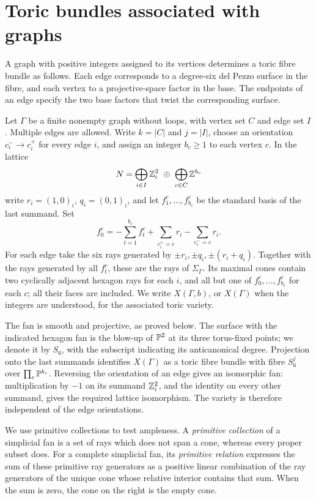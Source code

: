 \section{Toric bundles associated with graphs}\label{sec:graphs}

A graph with positive integers assigned to its vertices determines a
toric fibre bundle as follows. Each edge corresponds to a degree-six
del Pezzo surface in the fibre, and each vertex to a projective-space
factor in the base. The endpoints of an edge specify the two base
factors that twist the corresponding surface.

\begin{definition}\label{graph:construction}
Let $\Gamma$ be a finite nonempty graph without loops, with vertex set $C$
and edge set $I$.  Multiple edges are allowed.  Write $k=|C|$ and $j=|I|$,
choose an orientation $c_i^-\to c_i^+$ for every edge $i$, and assign an
integer $b_c\ge1$ to each vertex $c$.  In the lattice
\[
 N=\bigoplus_{i\in I}\ZZ^2_i\ \oplus\ \bigoplus_{c\in C}\ZZ^{b_c}
\]
write $r_i=(1,0)_i$, $q_i=(0,1)_i$, and let
$f^c_1,\ldots,f^c_{b_c}$ be the standard basis of the last summand.  Set
\begin{equation}\label{graph:base-rays}
 f^c_0=-\sum_{t=1}^{b_c}f^c_t+
       \sum_{c_i^+=c}r_i-\sum_{c_i^-=c}r_i.
\end{equation}
For each edge take the six rays generated by
$\pm r_i,\pm q_i,\pm(r_i+q_i)$.  Together with the rays generated by all
$f^c_t$, these are the rays of $\Sigma_\Gamma$.  Its maximal cones contain
two cyclically adjacent hexagon rays for each $i$, and all but one of
$f^c_0,\ldots,f^c_{b_c}$ for each $c$; all their faces are included.
We write $X(\Gamma,b)$, or $X(\Gamma)$ when the integers are understood,
for the associated toric variety.
\end{definition}

The fan is smooth and projective, as proved below.
The surface with the indicated hexagon fan is the blow-up of $\mathbb{P}^2$ at
its three torus-fixed points; we denote it by $S_6$, with the subscript
indicating its anticanonical degree.  Projection onto the last summands
identifies $X(\Gamma)$ as a toric fibre bundle with fibre $S_6^j$ over
$\prod_c\mathbb{P}^{b_c}$.  Reversing the orientation of an edge gives an
isomorphic fan: multiplication by $-1$ on its summand $\mathbb{Z}^2_i$, and the
identity on every other summand, gives the required lattice isomorphism.
The variety is therefore independent of the edge orientations.

We use primitive collections to test ampleness. A
\emph{primitive collection} of a simplicial fan is a set of rays which
does not span a cone, whereas every proper subset does.  For a complete
simplicial fan, its \emph{primitive relation} expresses the sum of these
primitive ray generators as a positive linear combination of the ray
generators of the unique cone whose relative interior contains that sum.
When the sum is zero, the cone on the right is the empty cone.


